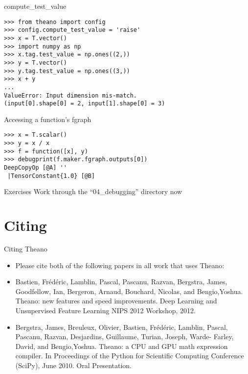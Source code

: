 \documentclass[utf8x]{beamer}
\begin{document}
\begin{frame}[fragile]{compute\_test\_value}

\begin{lstlisting}
>>> from theano import config
>>> config.compute_test_value = 'raise'
>>> x = T.vector()
>>> import numpy as np
>>> x.tag.test_value = np.ones((2,))
>>> y = T.vector()
>>> y.tag.test_value = np.ones((3,))
>>> x + y
...
ValueError: Input dimension mis-match.
(input[0].shape[0] = 2, input[1].shape[0] = 3)
\end{lstlisting}
\end{frame}

\begin{frame}[fragile]{Accessing a function’s fgraph}

\begin{lstlisting}
>>> x = T.scalar()
>>> y = x / x
>>> f = function([x], y)
>>> debugprint(f.maker.fgraph.outputs[0])
DeepCopyOp [@A] ''
 |TensorConstant{1.0} [@B]
\end{lstlisting}
\end{frame}

\begin{frame}{Exercises}
Work through the ``04\_debugging'' directory now
\end{frame}

\section{Citing}
\begin{frame}{Citing Theano}
  \begin{itemize}
  \item Please cite both of the following papers in
all work that uses Theano:
  \item Bastien, Frédéric, Lamblin, Pascal, Pascanu, Razvan, Bergstra, James, Goodfellow, Ian, Bergeron, Arnaud, Bouchard, Nicolas, and
     Bengio,Yoshua. Theano: new features and speed improvements. Deep Learning and Unsupervised Feature Learning NIPS 2012
    Workshop, 2012.
  \item Bergstra, James, Breuleux, Olivier, Bastien, Frédéric, Lamblin, Pascal, Pascanu, Razvan, Desjardins, Guillaume, Turian, Joseph, Warde-
     Farley, David, and Bengio,Yoshua. Theano: a CPU and GPU math expression compiler. In Proceedings of the Python for Scientific
      Computing Conference (SciPy), June 2010. Oral Presentation.
  \end{itemize}
\end{frame}
\end{document}
